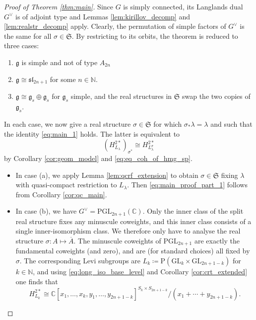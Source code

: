 \documentclass{amsart}
\newcommand{\C}{\mathbb{C}}
\newcommand{\g}{\mathfrak{g}}
\newcommand{\GL}{\mathrm{GL}}
\newcommand{\N}{\mathbb{N}}
\newcommand{\PGL}{\mathrm{PGL}}
\renewcommand{\sl}{\mathfrak{sl}}
\theoremstyle{definition}
\theoremstyle{plain}
\theoremstyle{remark}
\begin{document}
\begin{proof}[Proof of Theorem \ref{thm:main}]
    Since $G$ is simply connected, its Langlands dual $G^\vee$ is of adjoint type and Lemmas \ref{lem:kirillov_decomp} and \ref{lem:realstr_decomp} apply. Clearly, the permutation of simple factors of $G^\vee$ is the same for all $\sigma\in \mathfrak{S}$. By restricting to its orbits, the theorem is reduced to three cases:
    \begin{enumerate}
        \item[(a)] $\g$ is simple and not of type $A_{2n}$
        \item[(b)] $\g\cong \sl_{2n+1}$ for some $n\in \N$.
        \item[(c)] $\g\cong \g_s \oplus \g_s$ for $\g_s$ simple, and the real structures in $\mathfrak{S}$ swap the two copies of $\g_s$.
    \end{enumerate}
    In each case, we now give a real structure $\sigma\in \mathfrak{S}$ for which $\sigma_*\lambda = \lambda$ and such that the identity \eqref{eq:main_1} holds. The latter is equivalent to
    \begin{equation}
    \label{eq:main_proof_part_1}
        (H^{2*}_{L_\lambda})_{\sigma^*}
        \cong
        H^{2*}_{L_\lambda^\sigma}
    \end{equation}
    by Corollary \ref{cor:geom_model} and \eqref{eq:eq_coh_of_hmg_sp}.
    \begin{itemize}
        \item In case (a), we apply Lemma \ref{lem:qcrf_extension} to obtain $\sigma\in \mathfrak{S}$ fixing $\lambda$ with quasi-compact restriction to $L_\lambda$. Then \eqref{eq:main_proof_part_1} follows from Corollary \ref{cor:qc_main}.
        \item In case (b), we have $G^\vee = \PGL_{2n+1}(\C)$. Only the inner class of the split real structure fixes any minuscule coweights, and this inner class consists of a single inner-isomorphism class. We therefore only have to analyse the real structure $\sigma\colon A \mapsto \overline{A}$. The minuscule coweights of $\PGL_{2n+1}$ are exactly the fundamental coweights (and zero), and are (for standard choices) all fixed by $\sigma$. The corresponding Levi subgroups are $L_k\coloneqq \mathrm{P}(\GL_k\times \GL_{2n+1-k})$ for $k\in \N$, and using \eqref{eq:long_iso_base_level} and Corollary \ref{cor:crt_extended} one finds that
        $$
            H^{2*}_{L_k}
            \cong
            \C[x_1,\ldots, x_k, y_1,\ldots, y_{2n+1-k}]^{S_k\times S_{2n+1-k}}/(x_1 + \cdots + y_{2n+1-k}).
        $$
        

\end{itemize}
\end{proof}
\end{document}
